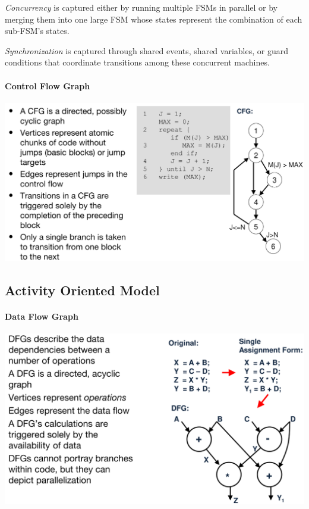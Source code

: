 \documentclass[english]{latex4ei/latex4ei_sheet}
\begin{document}
\textit{Concurrency} is captured either by running multiple FSMs in parallel or by merging them into one large FSM whose states represent the combination of each sub-FSM’s states.

\textit{Synchronization} is captured through shared events, shared variables, or guard conditions that coordinate transitions among these concurrent machines.

\paragraph{Control Flow Graph}

\begin{center}
  \includegraphics[width=0.8\linewidth]{assets/ControlFlowGraph.png}
  \label{fig:controlflowgraph}
\end{center}

\subsection{Activity Oriented Model}

\paragraph{Data Flow Graph}
 
\begin{center}
  \includegraphics[width=0.8\linewidth]{assets/DataFlowGraph.png}
  \label{fig:dataflowgraph}
\end{center}
\end{document}
